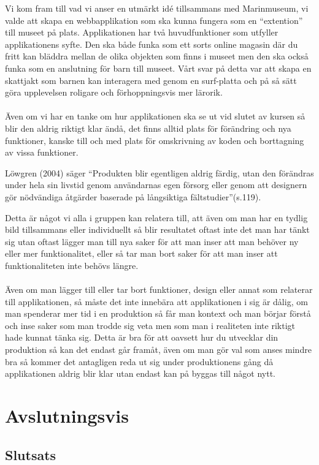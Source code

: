 \documentclass[12pt, titlepage]{article}
\begin{document}
Vi kom fram till vad vi anser en utmärkt idé tillsammans med Marinmuseum, vi valde att skapa en webbapplikation 
som ska kunna fungera som en “extention” till museet på plats. Applikationen har två huvudfunktioner som utfyller applikationens syfte. 
Den ska både funka som ett sorts online magasin där du fritt kan bläddra mellan de olika objekten som finns i 
museet men den ska också funka som en anslutning för barn till museet. Vårt svar på detta var att skapa en skattjakt som barnen 
kan interagera med genom en surf-platta och på så sätt göra upplevelsen roligare och förhoppningsvis mer lärorik.
\\
\\
Även om vi har en tanke om hur applikationen ska se ut vid slutet av kursen så blir den aldrig riktigt klar ändå, 
det finns alltid plats för förändring och nya funktioner, kanske till och med plats för omskrivning av koden och 
borttagning av vissa funktioner.

Löwgren (2004) säger “Produkten blir egentligen aldrig färdig, 
utan den förändras under hela sin livstid genom användarnas egen försorg eller genom att designern 
gör nödvändiga åtgärder baserade på långsiktiga fältstudier”(s.119). 

Detta är något vi alla i gruppen kan relatera till, 
att även om man har en tydlig bild tillsammans eller individuellt så blir resultatet oftast inte det man har tänkt 
sig utan oftast lägger man till nya saker för att man inser att man behöver ny eller mer funktionalitet, 
eller så tar man bort saker för att man inser att funktionaliteten inte behövs längre.
\\
\\
Även om man lägger till eller tar bort funktioner, design eller annat som relaterar till applikationen, 
så måste det inte innebära att applikationen i sig är dålig, om man spenderar mer tid i en produktion 
så får man kontext och man börjar förstå och inse saker som man trodde sig veta men som man i realiteten inte 
riktigt hade kunnat tänka sig. Detta är bra för att oavsett hur du utvecklar din produktion så kan det endast går framåt, 
även om man gör val som anses mindre bra så kommer det antagligen reda ut sig under produktionens gång då 
applikationen aldrig blir klar utan endast kan på byggas till något nytt.

\section{Avslutningsvis}
\subsection{Slutsats}
\end{document}
